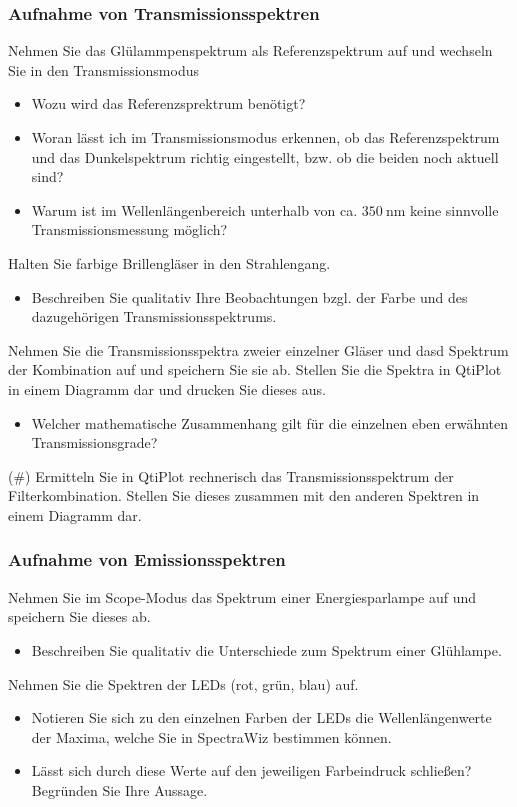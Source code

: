 \subsubsection{Aufnahme von Transmissionsspektren}
Nehmen Sie das Glülammpenspektrum als Referenzspektrum auf und wechseln Sie in den Transmissionsmodus
\begin{itemize}[label=$\blacktriangleright$]
	\item Wozu wird das Referenzsprektrum benötigt?
	\item Woran lässt ich im Transmissionsmodus erkennen, ob das Referenzspektrum und das Dunkelspektrum richtig eingestellt, bzw. ob die beiden noch aktuell sind?
	\item Warum ist im Wellenlängenbereich unterhalb von ca. $\SI{350}{\nano\meter}$ keine sinnvolle Transmissionsmessung möglich?
\end{itemize}
Halten Sie farbige Brillengläser in den Strahlengang.
\begin{itemize}[label=$\blacktriangleright$]
	\item Beschreiben Sie qualitativ Ihre Beobachtungen bzgl. der Farbe und des dazugehörigen Transmissionsspektrums.
\end{itemize}
Nehmen Sie die Transmissionsspektra zweier einzelner Gläser und dasd Spektrum der Kombination auf und speichern Sie sie ab. Stellen Sie die Spektra in QtiPlot in einem Diagramm dar und drucken Sie dieses aus.
\begin{itemize}[label=$\blacktriangleright$]
	\item Welcher mathematische Zusammenhang gilt für die einzelnen eben erwähnten Transmissionsgrade?
\end{itemize}
(\#) Ermitteln Sie in QtiPlot rechnerisch das Transmissionsspektrum der Filterkombination. Stellen Sie dieses zusammen mit den anderen Spektren in einem Diagramm dar.
\subsubsection{Aufnahme von Emissionsspektren}
Nehmen Sie im Scope-Modus das Spektrum einer Energiesparlampe auf und speichern Sie dieses ab.
\begin{itemize}[label=$\blacktriangleright$]
	\item Beschreiben Sie qualitativ die Unterschiede zum Spektrum einer Glühlampe.
\end{itemize}
Nehmen Sie die Spektren der LEDs (rot, grün, blau) auf.
\begin{itemize}[label=$\blacktriangleright$]
	\item Notieren Sie sich zu den einzelnen Farben der LEDs die Wellenlängenwerte der Maxima, welche Sie in SpectraWiz bestimmen können.
	\item Lässt sich durch diese Werte auf den jeweiligen Farbeindruck schließen? Begründen Sie Ihre Aussage.
\end{itemize}

